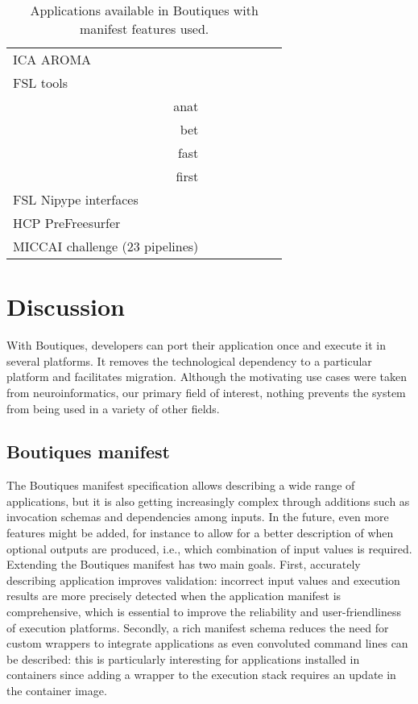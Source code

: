 \documentclass{article}
\newcommand{\boutiques}{Boutiques\xspace}
\begin{document}
\begin{table}
\begin{tabular}{l|ccc|ccc}
    ICA AROMA                       &\cellcolor{gray!75} &            &         &              &&\\
    FSL tools &&&&&\\
    \multicolumn{1}{r|}{anat}       &                    &            &         &              &&\\
    \multicolumn{1}{r|}{bet}        &                    &            &         &              &&\\
    \multicolumn{1}{r|}{fast}       &                    &            &         &              &&\\
    \multicolumn{1}{r|}{first}      &                    &            &         &              &&\\
    FSL Nipype interfaces     \\
    HCP PreFreesurfer               &\cellcolor{gray!75} &            &         &             &&\\
    MICCAI challenge (23 pipelines) &\cellcolor{gray!75} &            &         &             &&\\
  \end{tabular} 
  \caption{Applications available in Boutiques with manifest features used.}
  \label{table:applications}
\end{table}

\section{Discussion}

With Boutiques, developers can port their application once and execute
it in several platforms. It removes the technological dependency to a
particular platform and facilitates migration.  Although the
motivating use cases were taken from neuroinformatics, our primary
field of interest, nothing prevents the system from being used in a
variety of other fields.


\subsection{\boutiques manifest}

The \boutiques manifest specification allows describing a wide range
of applications, but it is also getting increasingly complex through
additions such as invocation schemas and dependencies among inputs. In
the future, even more features might be added, for instance to allow
for a better description of when optional outputs are produced, i.e.,
which combination of input values is required. Extending the
\boutiques manifest has two main goals. First, accurately describing
application improves validation: incorrect input values and execution
results are more precisely detected when the application manifest is
comprehensive, which is essential to improve the reliability and
user-friendliness of execution platforms. Secondly, a rich manifest
schema reduces the need for custom wrappers to integrate applications
as even convoluted command lines can be described: this is
particularly interesting for applications installed in containers
since adding a wrapper to the execution stack requires an update in
the container image.
\end{document}
